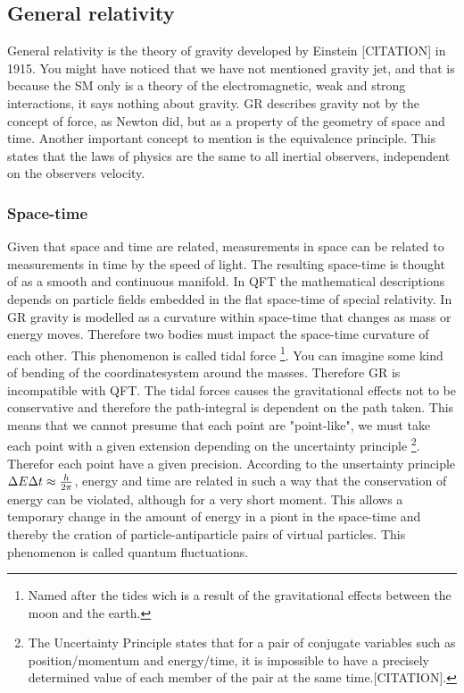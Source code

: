 \subsection{General relativity}
General relativity is the theory of gravity developed by Einstein [CITATION] in 1915. You might have noticed that we have not mentioned gravity jet, and that is because the SM only is a theory of the electromagnetic, weak and strong interactions, it says nothing about gravity. GR describes gravity not by the concept of force, as Newton did, but as a property of the geometry of space and time. Another important concept to mention is the equivalence principle. This states that the laws of physics are the same to all inertial observers, independent on the observers velocity.

\subsubsection{Space-time}
Given that space and time are related, measurements in space can be related to measurements in time by the speed of light. The resulting space-time is thought of as a smooth and continuous manifold. In QFT the mathematical descriptions depends on particle fields embedded in the flat space-time of special relativity. In GR gravity is modelled as a curvature within space-time that changes as mass or energy moves. Therefore two bodies must impact the space-time curvature of each other. This phenomenon is called tidal force \footnote{Named after the tides wich is a result of the gravitational effects between the moon and the earth.}. You can imagine some kind of bending of the coordinatesystem around the masses. Therefore GR is incompatible with QFT. The tidal forces causes the gravitational effects not to be conservative and therefore the path-integral is dependent on the path taken. This means that we cannot presume that each point are "point-like", we must take each point with a given extension depending on the uncertainty principle \footnote{The Uncertainty Principle states that for a pair of conjugate variables such as position/momentum and energy/time, it is impossible to have a precisely determined value of each member of the pair at the same time.[CITATION].}. Therefor each point have a given precision. According to the unsertainty principle $\Delta E \Delta t \approx {h \over 2 \pi}$, energy and time are related in such a way that the conservation of energy can be violated, although for a very short moment. This allows a temporary change in the amount of energy in a piont in the space-time and thereby the cration of particle-antiparticle pairs of virtual particles. This phenomenon is called quantum fluctuations.


